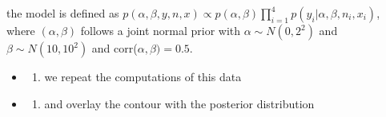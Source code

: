 \documentclass[
]{book}
\providecommand{\tightlist}{%
  \setlength{\itemsep}{0pt}\setlength{\parskip}{0pt}}
\theoremstyle{definition}
\theoremstyle{definition}
\theoremstyle{definition}
\theoremstyle{definition}
\theoremstyle{remark}
\begin{document}
the model is defined as \(p(\alpha,\beta,y,n,x) \propto p(\alpha,\beta)\prod_{i=1}^{4}p(y_i | \alpha,\beta,n_i,x_i)\), where \((\alpha,\beta)\) follows a joint normal prior with \(\alpha \sim N(0, 2^2)\) and \(\beta \sim N(10,10^2)\) and corr(\(\alpha,\beta) = 0.5\).

\begin{itemize}
\item
  \begin{enumerate}
  \def\labelenumi{(\alph{enumi})}
  \tightlist
  \item
    we repeat the computations of this data
  \end{enumerate}
\item
  \begin{enumerate}
  \def\labelenumi{(\alph{enumi})}
  \setcounter{enumi}{1}
  \tightlist
  \item
    and overlay the contour with the posterior distribution
  \end{enumerate}
\end{itemize}
\end{document}
